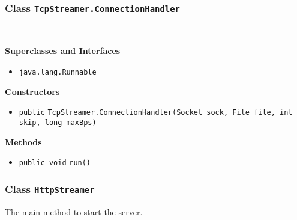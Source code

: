 \subsubsection{Class \lstinline|TcpStreamer.ConnectionHandler|}
 \\
\noindent\begin{minipage}[t]{5cm}
\vspace{0.3em}
\hspace*{2em}
\vspace{0.3em}
\end{minipage}



\textbf{\sffamily Superclasses and Interfaces}
\begin{itemize}
\item \lstinline|java.lang.Runnable|
\end{itemize}


\textbf{\sffamily Constructors}
\begin{itemize}
\item \lstinline|public| \lstinline|TcpStreamer.ConnectionHandler|\lstinline|(Socket sock, File file, int skip, long maxBps)| \\[-0.6em]




\end{itemize}


\textbf{\sffamily Methods}
\begin{itemize}
\item \lstinline|public void| \lstinline|run|\lstinline|()| \\[-0.6em]




\end{itemize}

\subsubsection{Class \lstinline|HttpStreamer|}
The main method to start the server. \\
\noindent\begin{minipage}[t]{5cm}
\vspace{0.3em}
\hspace*{2em}
\vspace{0.3em}
\end{minipage}





